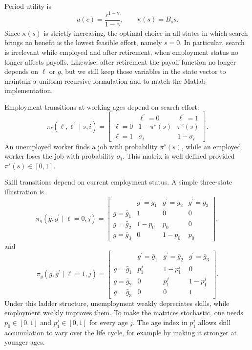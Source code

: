 \documentclass[11pt]{article}
\begin{document}
Period utility is
\begin{equation*}
u(c)=\frac{c^{1-\gamma}}{1-\gamma}, \qquad \kappa(s)=B_s s.
\end{equation*}
Since $\kappa(s)$ is strictly increasing, the optimal choice in all states in
which search brings no benefit is the lowest feasible effort, namely $s=0$.
In particular, search is irrelevant while employed and after retirement, when
employment status no longer affects payoffs. Likewise, after retirement the
payoff function no longer depends on $\ell$ or $g$, but we still keep those
variables in the state vector to maintain a uniform recursive formulation and
to match the Matlab implementation.

Employment transitions at working ages depend on search effort:
\begin{equation*}
\pi _{\ell }(\ell ,\ell ^{\prime }\mid s,i)=%
\begin{bmatrix}
& \ell ^{\prime }=0 & \ell ^{\prime }=1 \\ 
\ell =0 & 1-\pi ^{s}(s) & \pi ^{s}(s) \\ 
\ell =1 & \sigma _i & 1-\sigma _i%
\end{bmatrix}%
.
\end{equation*}%
An unemployed worker finds a job with probability $\pi ^{s}(s)$, while an
employed worker loses the job with probability $\sigma_i$. This matrix is
well defined provided $\pi^s(s)\in [0,1]$.

Skill transitions depend on current employment status. A simple three-state
illustration is
\begin{equation*}
\pi _{g}(g,g^{\prime }\mid \ell =0,j)=%
\begin{bmatrix}
& g^{\prime }=\bar{g}_{1} & g^{\prime }=\bar{g}_{2} & g^{\prime }=\bar{g}_{3}
\\ 
g=\bar{g}_{1} & 1 & 0 & 0 \\ 
g=\bar{g}_{2} & 1-p_{0} & p_{0} & 0 \\ 
g=\bar{g}_{3} & 0 & 1-p_{0} & p_{0}%
\end{bmatrix}%
,
\end{equation*}%
and
\begin{equation*}
\pi _{g}(g,g^{\prime }\mid \ell =1,j)=%
\begin{bmatrix}
& g^{\prime }=\bar{g}_{1} & g^{\prime }=\bar{g}_{2} & g^{\prime }=\bar{g}_{3}
\\ 
g=\bar{g}_{1} & p_{1}^{j} & 1-p_{1}^{j} & 0 \\ 
g=\bar{g}_{2} & 0 & p_{1}^{j} & 1-p_{1}^{j} \\ 
g=\bar{g}_{3} & 0 & 0 & 1%
\end{bmatrix}%
.
\end{equation*}%
Under this ladder structure, unemployment weakly depreciates skills, while
employment weakly improves them. To make the matrices stochastic, one needs
$p_0\in [0,1]$ and $p_1^j\in [0,1]$ for every age $j$. The age index in
$p_{1}^{j}$ allows skill accumulation to vary over the life cycle, for
example by making it stronger at younger ages. 
\end{document}
